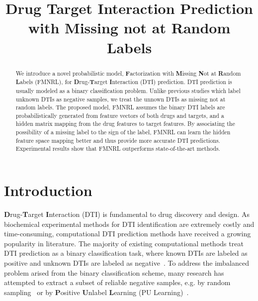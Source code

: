 \documentclass[sigconf,anonymous]{acmart}
\begin{document}
\title{Drug Target Interaction Prediction with Missing not at Random Labels}

\begin{abstract}
We introduce a novel probabilistic model, \textbf{F}actorization with \textbf{M}issing \textbf{N}ot at \textbf{R}andom \textbf{L}abels (FMNRL), for \textbf{D}rug-\textbf{T}arget \textbf{I}nteraction (DTI) prediction. DTI prediction is usually modeled as a binary classification problem. Unlike previous studies which label unknown DTIs as negative samples, we treat the unnown DTIs as missing not at random labels. The proposed model, FMNRL assumes the binary DTI labels are probabilistically generated from feature vectors of both drugs and targets, and a hidden matrix mapping from the drug features to target features. By associating the possibility of a missing label to the sign of the label, FMNRL can learn the hidden feature space mapping better and thus provide more accurate DTI predictions. Experimental results show that FMNRL outperforms state-of-the-art methods.
\end{abstract}



\maketitle
\section{Introduction}\label{sec:introduction}
\textbf{D}rug-\textbf{T}arget \textbf{I}nteraction (DTI) is fundamental to drug discovery and design. As biochemical experimental methods for DTI identification are extremely costly and time-consuming, computational DTI prediction methods have received a growing popularity in literature. The majority of existing computational methods treat DTI prediction as a binary classification task, where known DTIs are labeled as positive and unknown DTIs are labeled as negative~\cite{Ding2013Similarity}. To address the imbalanced problem arised from the binary classification scheme, many research has attempted to extract a subset of reliable negative samples, e.g. by random sampling~\cite{Luo2017Network} or by \textbf{P}ositive \textbf{U}nlabel \textbf{L}earning (PU Learning)~\cite{Peng2017Screening}.
\end{document}
